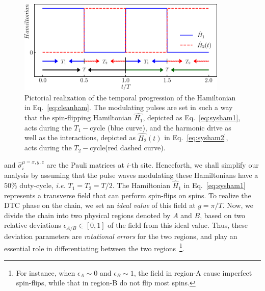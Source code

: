 \documentclass[12pt]{iopart}
\begin{document}
\begin{figure}
    \begin{center}
        \includegraphics[width=10cm]{drive_distribution.pdf}
    \end{center}
    \caption{Pictorial realization of the temporal progression of the Hamiltonian in Eq.~\eqref{eq:cleanham}. The modulating pulses are set in such a way that the spin-flipping Hamiltonian $\hat{H_1}$, depicted as Eq.~\eqref{eq:sysham1}, acts during the $T_1-$cycle (blue curve), and the harmonic drive as well as the interactions, depicted as $\hat{H_2}(t)$ in Eq.~\eqref{eq:sysham2}, acts during the $T_2-$cycle(red dashed curve).}
    \label{Fig:time_distribution}
\end{figure}	
and $\hat{\sigma}^{\mu=x,y,z}_i$ are the Pauli matrices at $i$-th site.  Henceforth, we shall simplify our analysis by assuming that the pulse waves modulating these Hamiltonians have a $50 \%$ duty-cycle, \textit{i.e.} $T_1=T_2=T/2$.  The Hamiltonian $\hat{H}_1$ in Eq.~\eqref{eq:sysham1} represents a transverse field that can perform spin-flips on spins. To realize the DTC phase on the chain, we set an \textit{ideal value} of this field at $g=\pi/T$. Now, we divide the chain into two physical regions denoted by $A$ and $B$, based on two relative deviations $\epsilon_{A/B}\in[0,1]$ of the field from this ideal value. Thus, these deviation parameters are \textit{rotational errors} for the two regions, and play an essential role in differentiating between the two regions~\footnote{For instance, when $\epsilon_A \sim 0$ and $\epsilon_B \sim 1$, the field in region-A cause imperfect spin-flips, while that in region-B do not flip most spins.}.
\end{document}
